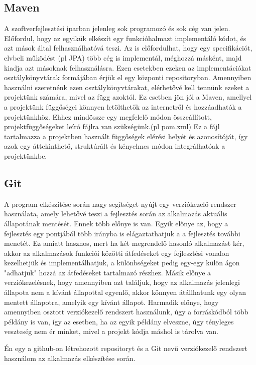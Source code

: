 \documentclass[centeredchapter]{thesis-ekf}
\theoremstyle{definition}
\theoremstyle{remark}
\begin{document}
\subsection{Maven}

A szoftverfejlesztési iparban jelenleg sok programozó és sok cég van jelen. Előfordul, hogy az egyikük elkészít egy funkcióhalmazt implementáló kódot, és azt mások által felhasználhatóvá teszi.
Az is előfordulhat, hogy egy specifikációt, elvbeli működést (pl JPA) több cég is implementál, méghozzá másként, majd kiadja azt másoknak felhasználásra. Ezen esetekben ezeken az implementációkat osztálykönyvtárak formájában érjük el egy központi repositoryban. Amennyiben használni szeretnénk ezen osztálykönyvtárakat, elérhetővé kell tennünk ezeket a projektünk számára, mivel az függ azoktól. Ez esetben jön jól a Maven, amellyel a projektünk függőségei könnyen letölthetők az internetről és hozzáadhatók a projektünkhöz. Ehhez mindössze egy megfelelő módon összeállított, projektfüggőségeket leíró fájlra van szükségünk.(pl pom.xml) Ez a fájl tartalmazza a projektben használt függőségek elérési helyét és azonosítóját, így azok egy áttekinthető, struktúrált és kényelmes módon integrálhatóak a projektünkbe.

\subsection{Git}

A program elkészítése során nagy segítséget nyújt egy verziókezelő rendszer használata, amely lehetővé teszi a fejlesztés során az alkalmazás aktuális állapotának mentését. Ennek több előnye is van. Egyik előnye az, hogy a fejlesztés egy pontjából több irányba is elágaztathatjuk a a fejlesztés további menetét. Ez amiatt hasznos, mert ha két megrendelő hasonló alkalmazást kér, akkor az alkalmazások funkciói közötti átfedéseket egy fejlesztési vonalon kezelhetjük és implementálhatjuk, a különbségeket pedig egy-egy külön ágon "adhatjuk" hozzá az átfedéseket tartalmazó részhez. Másik előnye a verziókezelésnek, hogy amennyiben azt találjuk, hogy az alkalmazás jelenlegi állapota nem a kívánt állapottal egyenlő, akkor könnyen átállhatunk egy olyan mentett állapotra, amelyik egy kívánt állapot. Harmadik előnye, hogy amennyiben osztott verziókezelő rendszert használunk, úgy a forráskódból több példány is van, így az esetben, ha az egyik példány elveszne, úgy tényleges veszteség nem ér minket, mivel a projekt kódja máshol is tárolva van.

Én egy a github-on létrehozott repositoryt és a Git nevű verziókezelő rendszert használom az alkalmazás elkészítése során.
\end{document}
